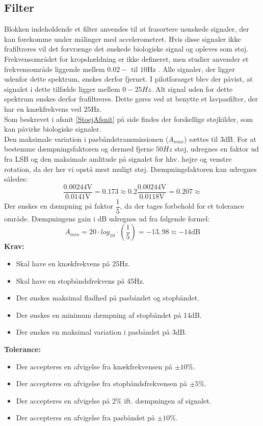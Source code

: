 \subsection{Filter}\label{FilterAfs}
Blokken indeholdende et filter anvendes til at frasortere uønskede signaler, der kan forekomme under målinger med accelerometret. Hvis disse signaler ikke frafiltreres vil det forvrænge det ønskede biologiske signal og opleves som støj. Frekvensområdet for kropshældning er ikke defineret, men studier anvender et frekvensområde liggende mellem $0.02-$ til $10$Hz \cite{Martinez-Mendez2011}. Alle signaler, der ligger udenfor dette spektrum, ønskes derfor fjernet. I pilotforsøget blev der påvist, at signalet i dette tilfælde ligger mellem $0-25Hz$. Alt signal uden for dette spektrum ønskes derfor frafiltreres. Dette gøres ved at benytte et lavpasfilter, der har en knækfrekvens ved $25$Hz. \\
Som beskrevet i afsnit \ref{StoejAfsnit} på side \pageref{StoejAfsnit} findes der forskellige støjkilder, som kan påvirke biologiske signaler. \\
Den maksimale variation i pasbåndstransmissionen ($A_{max}$) sættes til 3dB. For at bestemme dæmpningsfaktoren og dermed fjerne $50Hz$ støj, udregnes en faktor ud fra LSB og den maksimale amlitude på signalet for hhv. højre og venstre rotation, da der her vi opstå mest muligt støj. Dæmpningsfaktoren kan udregnes således:
\begin{equation}
\dfrac{0.00244\text{V}}{0.0141\text{V}} = 0.173 \approx 0.2 
\dfrac{0.00244\text{V}}{0.0118\text{V}} = 0.207  \approx 
\end{equation}
Der ønskes en dæmpning på faktor $\dfrac{1}{5}$, da der tages forbehold for et tolerance område. Dæmpningens gain i dB udregnes ud fra følgende formel:   
\begin{equation}
A_{min}=20 \cdot log_{10} \cdot (\frac{1}{5}) = -13,98 \approx -14\text{dB}
\end{equation}
\textbf{Krav:}
\begin{itemize}
	\item Skal have en knækfrekvens på 25Hz.
	\item Skal have en stopbåndsfrekvens på 45Hz.
	\item Der ønskes maksimal fladhed på pasbåndet og stopbåndet.
	\item Der ønskes en minimum dæmpning af stopbåndet på 14dB.
	\item Der ønskes en maksimal variation i pasbåndet på 3dB.
\end{itemize}
\textbf{Tolerance:}
\begin{itemize}
	\item Der accepteres en afvigelse fra knækfrekvensen på $\pm10\%$.
	\item Der accepteres en afvigelse fra stopbåndsfrekvensen på $\pm5\%$.
	\item Der accepteres en afvigelse på $2\%$ ift. dæmpningen af signalet.
	\item Der accepteres en afvigelse fra pasbåndet på $\pm10\%$.
\end{itemize}
